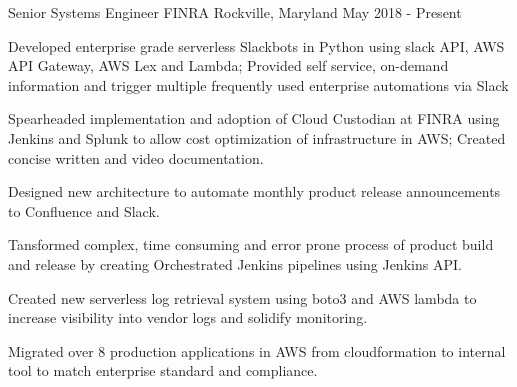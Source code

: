 

\begin{cventries}

  \cventryemp
    {Senior Systems Engineer} %
    {FINRA} %
    {Rockville, Maryland} %
    {May 2018 - Present} %
    {}
    {
      \begin{cvitems} %
        \item {Developed enterprise grade serverless Slackbots in Python using slack API, AWS API Gateway, AWS Lex and Lambda; Provided self service, on-demand information and trigger multiple frequently used enterprise automations via Slack}
        \item {Spearheaded implementation and adoption of Cloud Custodian at FINRA using Jenkins and Splunk to allow cost optimization of infrastructure in AWS; Created concise written and video documentation.}
        \item {Designed new architecture to automate monthly product release announcements to Confluence and Slack.}
        \item {Tansformed complex, time consuming and error prone process of product build and release by creating Orchestrated Jenkins pipelines using Jenkins API.}
        \item {Created new serverless log retrieval system using boto3 and AWS lambda to increase visibility into vendor logs and solidify monitoring.}
        \item {Migrated over 8 production applications in AWS from cloudformation to internal tool to match enterprise standard and compliance.}
      \end{cvitems}
    }


\end{cventries}
